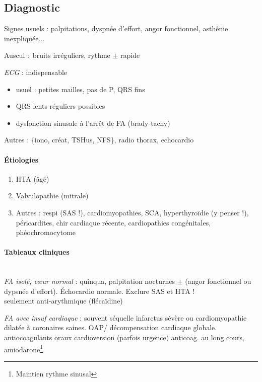\subsection{Diagnostic}
Signes usuels : palpitations, dyspnée d'effort, angor fonctionnel, asthénie
inexpliquée...

Auscul : bruits irréguliers, rythme $\pm$ rapide

\textit{ECG} : indispensable \danger
\begin{itemize}
  \item usuel : petites mailles, pas de P, QRS fins
  \item QRS lents réguliers possibles
  \item dysfonction sinusale à l'arrêt de \gls{FA} (brady-tachy)
\end{itemize}

Autres : \{iono, créat, TSHus, NFS\}, radio thorax, echocardio

\paragraph{Étiologies}
\begin{enumerate}
  \item HTA (âgé)
  \item Valvulopathie (mitrale)
  \item Autres : respi (SAS !), cardiomyopathies, SCA, hyperthyroïdie (y penser
    !), péricardites, chir cardiaque récente, cardiopathies congénitales,
    phéochromocytome
\end{enumerate}

\paragraph{Tableaux cliniques}\mbox{}\\
\textit{FA isolé, c\oe{}ur normal} : quinqua, palpitation nocturnes $\pm$ (angor
fonctionnel ou dypsnée d'effort). Échocardio normale. Exclure SAS et HTA !\\
\hspace*{10pt}\thus seulement anti-arythmique (flécaïdine)

\textit{FA avec insuf cardiaque} : souvent séquelle infarctus sévère ou
cardiomyopathie dilatée à coronaires saines. OAP/ décompensation cardiaque
globale.\\
\hspace*{10pt}\thus antiocoagulants oraux \arrow{} cardioversion (parfois urgence) \arrow{}
anticoag. au long cours, amiodarone\footnote{Maintien rythme sinusal}


